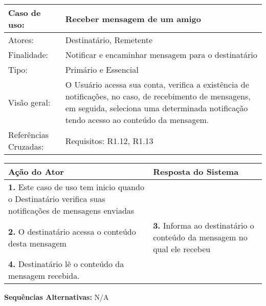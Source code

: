 \documentclass[12pt,a4paper,onecolumn,titlepage]{article}
\begin{document}
\begin{table}[h!]
\begin{center}
\begin{tabular}{p{2.5cm} p{9.5cm}}
Caso de uso: & \textbf{Receber mensagem de um amigo} \\ \hline
Atores: & Destinatário, Remetente \\ \hline
Finalidade: & Notificar e encaminhar mensagem para o destinatário\\ \hline
Tipo: & Primário e Essencial \\ \hline
Visão geral: & O Usuário acessa sua conta, verifica a existência de notificações, no caso, de recebimento de mensagens, em seguida, seleciona uma determinada notificação tendo acesso ao conteúdo da mensagem. \\ \hline
Referências Cruzadas: & Requisitos: R1.12, R1.13\\

\end{tabular}
\end{center}
\end{table} 

\begin{center}
\def\arraystretch{1.1}
\begin{tabular}{|p{6cm}|p{6cm}|}

\hline
\textbf{Ação do Ator} & \textbf{Resposta do Sistema} \\ \hline
\textbf{1.} Este caso de uso tem inicio quando o Destinatário verifica suas notificações de mensagens enviadas  &  \\ \hline
\textbf{2.} O destinatário acessa o conteúdo desta mensagem  & 
\textbf{3.} Informa ao destinatário o conteúdo da mensagem no qual ele recebeu \\ \hline
\textbf{4.} Destinatário lê o conteúdo da mensagem recebida. & \\ \hline
\end{tabular}
\end{center}

\textbf{Sequências Alternativas:} N/A

\newpage
\end{document}
